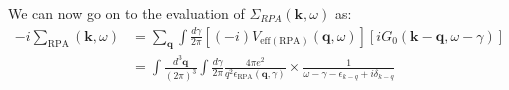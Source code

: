 We can now go on to the evaluation of $\Sigma_{RPA}(\mathbf{k},\omega)$ as:
\begin{equation}\begin{aligned}
-i \sum_{\mathrm{RPA}}(\mathbf{k}, \omega) &=\sum_{\mathbf{q}} \int \frac{d \gamma}{2 \pi}\left[(-i) V_{\mathrm{eff}(\mathrm{RPA})}(\mathbf{q}, \omega)\right]\left[i G_{0}(\mathbf{k}-\mathbf{q}, \omega-\gamma)\right] \\
&=\int \frac{d^{3} \mathbf{q}}{(2 \pi)^{3}} \int \frac{d \gamma}{2 \pi} \frac{4 \pi e^{2}}{q^{2} \epsilon_{\mathrm{RPA}}(\mathbf{q}, \gamma)} \times \frac{1}{\omega-\gamma-\epsilon_{k-q}+i \delta_{k-q}}
\end{aligned}
\label{Sigma-RPA-int}
\end{equation}
